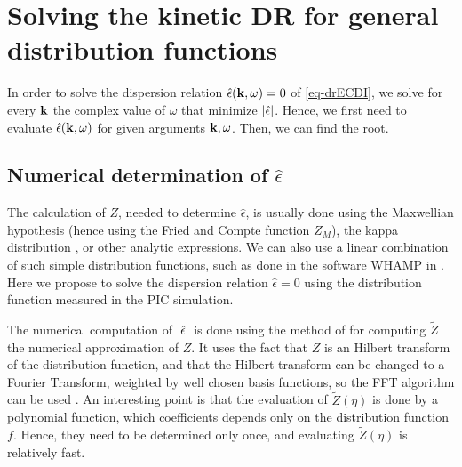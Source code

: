 
\section{Solving the kinetic \acs{DR} for general distribution functions}
  \label{sec-DR-solver}


  In order to solve the dispersion relation $\hat\epsilon({\mathbf k}, \omega) = 0$ of \cref{eq-drECDI}, we solve for every ${\mathbf k}$ the complex value of $\omega$ that minimize $\lvert\hat\epsilon\rvert$.
  Hence, we first need to evaluate $\hat\epsilon({\mathbf k}, \omega)$ for given arguments ${\mathbf k}, \omega$.
  Then, we can find the root.
  

  \subsection{Numerical determination of \texorpdfstring{$\hat\epsilon$}{the plasma dielectric function.}} \label{subsec-numepsilon}
  
  The calculation of $Z$, needed to determine $\hat{\epsilon}$, is usually done using the Maxwellian hypothesis \citep{cavalier2013} (hence using the Fried and Compte function $Z_M$), the kappa distribution \citep{ziebell2017}, or other analytic expressions.
  We can also use a linear combination of such simple distribution functions, such as done in the software WHAMP in \citet{ronnmark1982}.
  Here we propose to solve the dispersion relation $\hat{\epsilon}=0$ using the distribution function measured in the \ac{PIC} simulation.
  
  The numerical computation of $\lvert\hat\epsilon\rvert$ is done using the method of \citet{xie2013} for computing $\tilde{Z}$ the numerical approximation of $Z$. 
  It uses the fact that $Z$ is an Hilbert transform of the distribution function, and that the Hilbert transform can be changed to a Fourier Transform, weighted by well chosen basis functions, so the \ac{FFT} algorithm can be used \citep{weideman1995}.
  An interesting point is that the evaluation of $\tilde{Z}(\eta)$ is done by a polynomial function, which coefficients depends only on the distribution function $f$. 
  Hence, they need to be determined only once, and evaluating $\tilde{Z}(\eta)$ is relatively fast.
  
